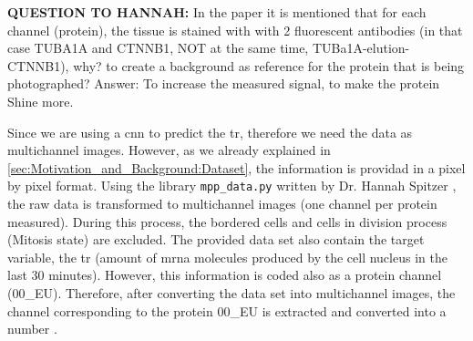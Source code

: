 \textbf{QUESTION TO HANNAH:} In the paper it is mentioned that for each channel (protein), the tissue is stained with with 2 fluorescent antibodies (in that case TUBA1A and CTNNB1, NOT at the same time, TUBa1A-elution-CTNNB1), why? to create a background as reference for the protein that is being photographed?
Answer: To increase the measured signal, \ie to make the protein Shine more.

Since we are using a \gls{cnn} to predict the \gls{tr}, therefore we need the data as multichannel images. However, as we already explained in \ref{sec:Motivation_and_Background:Dataset}, the information is providad in a pixel by pixel format. Using the library \texttt{mpp\_data.py} written by Dr. Hannah Spitzer , the raw data is transformed to multichannel images (one channel per protein measured). During this process, the bordered cells and cells in division process (Mitosis state) are excluded. The provided data set also contain the target variable, \ie the \gls{tr} (amount of \gls{mrna} molecules produced by the cell nucleus in the last 30 minutes). However, this information is coded also as a protein channel (00\_EU). Therefore, after converting the data set into multichannel images, the channel corresponding to the protein 00\_EU is extracted and converted into a number .

